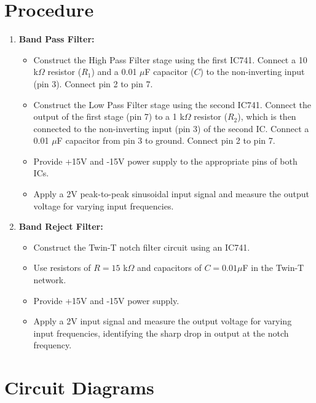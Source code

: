 \documentclass[12pt,a4paper]{article}
\begin{document}
\section{Procedure}
\begin{enumerate}
    \item \textbf{Band Pass Filter:} 
    \begin{itemize}
        \item Construct the High Pass Filter stage using the first IC741. Connect a 10 k$\Omega$ resistor ($R_1$) and a 0.01 $\mu$F capacitor ($C$) to the non-inverting input (pin 3). Connect pin 2 to pin 7.
        \item Construct the Low Pass Filter stage using the second IC741. Connect the output of the first stage (pin 7) to a 1 k$\Omega$ resistor ($R_2$), which is then connected to the non-inverting input (pin 3) of the second IC. Connect a 0.01 $\mu$F capacitor from pin 3 to ground. Connect pin 2 to pin 7.
        \item Provide +15V and -15V power supply to the appropriate pins of both ICs.
        \item Apply a 2V peak-to-peak sinusoidal input signal and measure the output voltage for varying input frequencies.
    \end{itemize}
    
    \item \textbf{Band Reject Filter:}
    \begin{itemize}
        \item Construct the Twin-T notch filter circuit using an IC741.
        \item Use resistors of $R = 15$ k$\Omega$ and capacitors of $C = 0.01 \mu$F in the Twin-T network.
        \item Provide +15V and -15V power supply.
        \item Apply a 2V input signal and measure the output voltage for varying input frequencies, identifying the sharp drop in output at the notch frequency.
    \end{itemize}
\end{enumerate}

\section{Circuit Diagrams}
\end{document}
